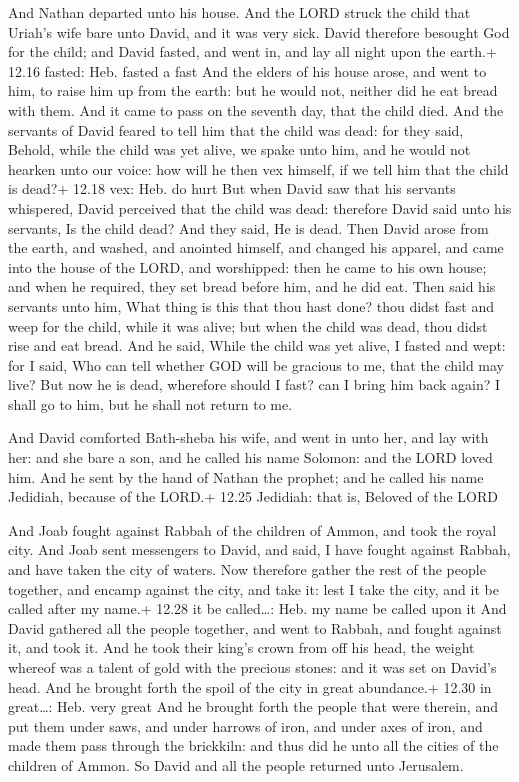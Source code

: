  And Nathan departed unto his house. And the LORD struck
the child that Uriah's wife bare unto David, and it was very sick.
 David therefore besought God for the child; and David
fasted, and went in, and lay all night upon the earth.+ 12.16 fasted:
Heb. fasted a fast  And the elders of his house arose, and
went to him, to raise him up from the earth: but he would not, neither
did he eat bread with them.  And it came to pass on the
seventh day, that the child died. And the servants of David feared to
tell him that the child was dead: for they said, Behold, while the child
was yet alive, we spake unto him, and he would not hearken unto our
voice: how will he then vex himself, if we tell him that the child is
dead?+ 12.18 vex: Heb. do hurt  But when David saw that his
servants whispered, David perceived that the child was dead: therefore
David said unto his servants, Is the child dead? And they said, He is
dead.  Then David arose from the earth, and washed, and
anointed himself, and changed his apparel, and came into the house of
the LORD, and worshipped: then he came to his own house; and when he
required, they set bread before him, and he did eat.  Then
said his servants unto him, What thing is this that thou hast done? thou
didst fast and weep for the child, while it was alive; but when the
child was dead, thou didst rise and eat bread.  And he
said, While the child was yet alive, I fasted and wept: for I said, Who
can tell whether GOD will be gracious to me, that the child may live?
 But now he is dead, wherefore should I fast? can I bring
him back again? I shall go to him, but he shall not return to me.

 And David comforted Bath-sheba his wife, and went in
unto her, and lay with her: and she bare a son, and he called his name
Solomon: and the LORD loved him.  And he sent by the hand
of Nathan the prophet; and he called his name Jedidiah, because of the
LORD.+ 12.25 Jedidiah: that is, Beloved of the LORD

 And Joab fought against Rabbah of the children of Ammon,
and took the royal city.  And Joab sent messengers to
David, and said, I have fought against Rabbah, and have taken the city
of waters.  Now therefore gather the rest of the people
together, and encamp against the city, and take it: lest I take the
city, and it be called after my name.+ 12.28 it be called\ldots: Heb. my
name be called upon it  And David gathered all the people
together, and went to Rabbah, and fought against it, and took it.
 And he took their king's crown from off his head, the
weight whereof was a talent of gold with the precious stones: and it was
set on David's head. And he brought forth the spoil of the city in great
abundance.+ 12.30 in great\ldots: Heb. very great  And he
brought forth the people that were therein, and put them under saws, and
under harrows of iron, and under axes of iron, and made them pass
through the brickkiln: and thus did he unto all the cities of the
children of Ammon. So David and all the people returned unto Jerusalem.

